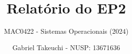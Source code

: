 \documentclass{beamer}
\title{Relatório do EP2}
\subtitle{MAC0422 - Sistemas Operacionais (2024)}
\author{Gabriel Takeuchi - NUSP: 13671636}
\date{}
\begin{document}
\begin{frame}
  \titlepage
\end{frame}
\end{document}
